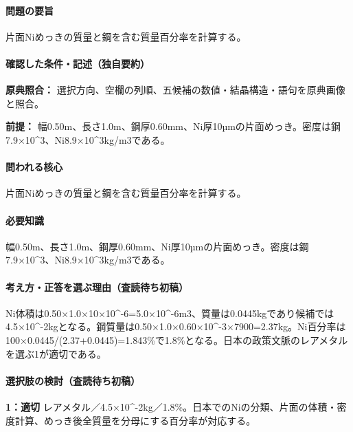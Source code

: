 \paragraph{問題の要旨} 片面Niめっきの質量と鋼を含む質量百分率を計算する。

\paragraph{確認した条件・記述（独自要約）}\mbox{}\par

\noindent\textbf{原典照合：} 選択方向、空欄の列順、五候補の数値・結晶構造・語句を原典画像と照合。\par

\noindent\textbf{前提：} 幅0.50m、長さ1.0m、鋼厚0.60mm、Ni厚10µmの片面めっき。密度は鋼7.9×10\textasciicircum{}3、Ni8.9×10\textasciicircum{}3kg/m3である。\par

\paragraph{問われる核心} 片面Niめっきの質量と鋼を含む質量百分率を計算する。

\paragraph{必要知識} 幅0.50m、長さ1.0m、鋼厚0.60mm、Ni厚10µmの片面めっき。密度は鋼7.9×10\textasciicircum{}3、Ni8.9×10\textasciicircum{}3kg/m3である。

\paragraph{考え方・正答を選ぶ理由（査読待ち初稿）} Ni体積は0.50×1.0×10×10\textasciicircum{}-6=\allowbreak{}5.0×10\textasciicircum{}-6m3、質量は0.0445kgであり候補では4.5×10\textasciicircum{}-2kgとなる。鋼質量は0.50×1.0×0.60×10\textasciicircum{}-3×7900=\allowbreak{}2.37kg。Ni百分率は100×0.0445/(2.37+0.0445)=\allowbreak{}1.843\%で1.8\%となる。日本の政策文脈のレアメタルを選ぶ1が適切である。

\paragraph{選択肢の検討（査読待ち初稿）}\mbox{}\par

\noindent\textbf{1：適切} レアメタル／4.5×10\textasciicircum{}-2kg／1.8\%。日本でのNiの分類、片面の体積・密度計算、めっき後全質量を分母にする百分率が対応する。\par

